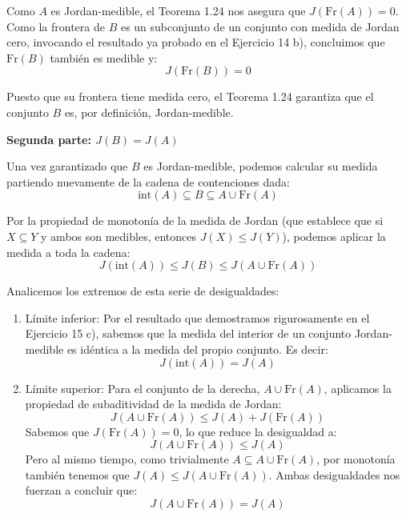 \documentclass[11pt,letterpaper]{article}
\begin{document}
Como $A$ es Jordan-medible, el Teorema 1.24 nos asegura que $J(\text{Fr}(A)) = 0$. Como la frontera de $B$ es un subconjunto de un conjunto con medida de Jordan cero, invocando el resultado ya probado en el Ejercicio 14 b), concluimos que $\text{Fr}(B)$ también es medible y:
\begin{equation*}
J(\text{Fr}(B)) = 0
\end{equation*}

Puesto que su frontera tiene medida cero, el Teorema 1.24 garantiza que el conjunto $B$ es, por definición, Jordan-medible.

\vspace{0.5cm}
\textbf{Segunda parte: $J(B) = J(A)$}

Una vez garantizado que $B$ es Jordan-medible, podemos calcular su medida partiendo nuevamente de la cadena de contenciones dada:
\begin{equation*}
\text{int}(A) \subseteq B \subseteq A \cup \text{Fr}(A)
\end{equation*}

Por la propiedad de monotonía de la medida de Jordan (que establece que si $X \subseteq Y$ y ambos son medibles, entonces $J(X) \le J(Y)$), podemos aplicar la medida a toda la cadena:
\begin{equation*}
J(\text{int}(A)) \le J(B) \le J(A \cup \text{Fr}(A))
\end{equation*}

Analicemos los extremos de esta serie de desigualdades:
\begin{enumerate}
    \item Límite inferior: Por el resultado que demostramos rigurosamente en el Ejercicio 15 c), sabemos que la medida del interior de un conjunto Jordan-medible es idéntica a la medida del propio conjunto. Es decir:
    \begin{equation*}
    J(\text{int}(A)) = J(A)
    \end{equation*}
    
    \item Límite superior: Para el conjunto de la derecha, $A \cup \text{Fr}(A)$, aplicamos la propiedad de subaditividad de la medida de Jordan:
    \begin{equation*}
    J(A \cup \text{Fr}(A)) \le J(A) + J(\text{Fr}(A))
    \end{equation*}
    Sabemos que $J(\text{Fr}(A)) = 0$, lo que reduce la desigualdad a:
    \begin{equation*}
    J(A \cup \text{Fr}(A)) \le J(A)
    \end{equation*}
    Pero al mismo tiempo, como trivialmente $A \subseteq A \cup \text{Fr}(A)$, por monotonía también tenemos que $J(A) \le J(A \cup \text{Fr}(A))$. Ambas desigualdades nos fuerzan a concluir que:
    \begin{equation*}
    J(A \cup \text{Fr}(A)) = J(A)
    \end{equation*}
\end{enumerate}
\end{document}
